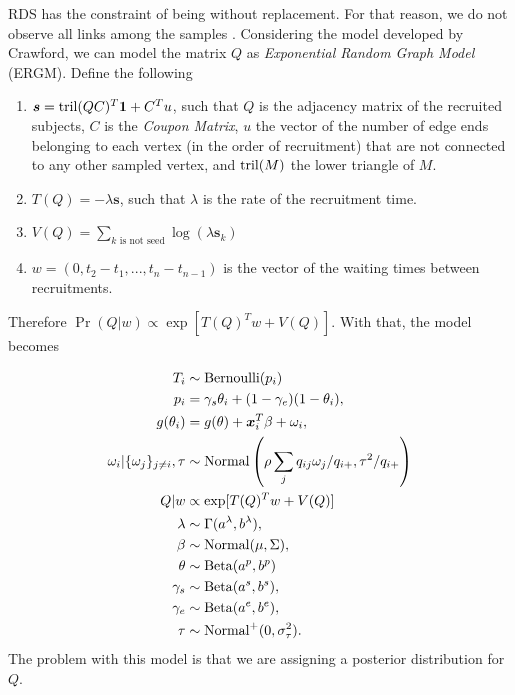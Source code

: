 RDS has the constraint of being without replacement. For that reason, we do
not observe all links among the samples \cite[]{crawford2016}. Considering the
model developed by Crawford, we can model the
matrix $Q$ as {\em Exponential Random Graph Model} (ERGM). Define the
following 

\begin{enumerate}
  \item $\boldsymbol{s} = \operatorname{tril}(QC)^T \boldsymbol{1} + C^Tu$, such that $Q$ is the
  adjacency matrix of the recruited subjects, $C$ is the {\em Coupon Matrix},
  $u$ the vector of the number of edge ends belonging to each vertex
  (in the order of recruitment) that are not connected to any other sampled
  vertex, and $\operatorname{tril}(M)$ the lower triangle of $M$. 

  \item $T(Q) = -\lambda \boldsymbol{s}$, such that $\lambda$ is the rate of
  the recruitment time. 

  \item $V(Q) = \sum_{k \text{ is not seed}} \log(\lambda \boldsymbol{s}_k)$
  
  \item $w = (0, t_2 - t_1, ..., t_n - t_{n-1})$ is the vector of the waiting times between
  recruitments.  
\end{enumerate}

Therefore $\Pr(Q|w) \propto \exp[T(Q)^Tw + V(Q)]$. With that, the model
becomes 

\begin{equation}
  \begin{aligned}
    T_i &\sim \operatorname{Bernoulli}(p_i) \\
    p_i &= \gamma_s\theta_i + (1-\gamma_e)(1 - \theta_i),  \\
    g(\theta_i) &= g(\theta) + \boldsymbol{x}_i^T\beta + \omega_i,  \\
    \omega_i|\{\omega_j\}_{j\neq i}, \tau &\sim \operatorname{Normal}\left(\rho\sum_j q_{ij}\omega_j/q_{i+}, \tau^2/q_{i+}\right) \\
    Q|w &\propto \exp[T(Q)^Tw + V(Q)] \\
    \lambda &\sim \Gamma(a^{\lambda}, b^{\lambda}), \\ 
    \beta &\sim \operatorname{Normal}(\mu, \Sigma), \\ 
    \theta &\sim \operatorname{Beta}(a^p, b^p) \\
    \gamma_s &\sim \operatorname{Beta}(a^s, b^s), \\
    \gamma_e &\sim \operatorname{Beta}(a^e, b^e), \\  
    \tau &\sim \operatorname{Normal}^+(0,\sigma^2_{\tau}).
  \end{aligned}  
\end{equation}
The problem with this model is that we are assigning a posterior distribution
for $Q$.

